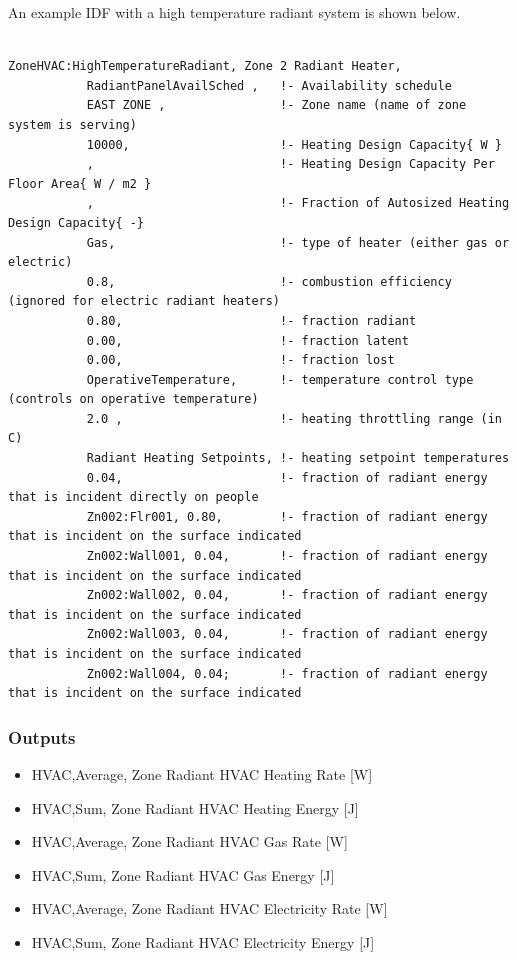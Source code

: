 An example IDF with a high temperature radiant system is shown below.

\begin{lstlisting}

ZoneHVAC:HighTemperatureRadiant, Zone 2 Radiant Heater,
           RadiantPanelAvailSched ,   !- Availability schedule
           EAST ZONE ,                !- Zone name (name of zone system is serving)
           10000,                     !- Heating Design Capacity{ W }
           ,                          !- Heating Design Capacity Per Floor Area{ W / m2 }
           ,                          !- Fraction of Autosized Heating Design Capacity{ -}
           Gas,                       !- type of heater (either gas or electric)
           0.8,                       !- combustion efficiency (ignored for electric radiant heaters)
           0.80,                      !- fraction radiant
           0.00,                      !- fraction latent
           0.00,                      !- fraction lost
           OperativeTemperature,      !- temperature control type (controls on operative temperature)
           2.0 ,                      !- heating throttling range (in C)
           Radiant Heating Setpoints, !- heating setpoint temperatures
           0.04,                      !- fraction of radiant energy that is incident directly on people
           Zn002:Flr001, 0.80,        !- fraction of radiant energy that is incident on the surface indicated
           Zn002:Wall001, 0.04,       !- fraction of radiant energy that is incident on the surface indicated
           Zn002:Wall002, 0.04,       !- fraction of radiant energy that is incident on the surface indicated
           Zn002:Wall003, 0.04,       !- fraction of radiant energy that is incident on the surface indicated
           Zn002:Wall004, 0.04;       !- fraction of radiant energy that is incident on the surface indicated
\end{lstlisting}

\subsubsection{Outputs}\label{outputs-8-006}

\begin{itemize}
\item
  HVAC,Average, Zone Radiant HVAC Heating Rate {[}W{]}
\item
  HVAC,Sum, Zone Radiant HVAC Heating Energy {[}J{]}
\item
  HVAC,Average, Zone Radiant HVAC Gas Rate {[}W{]}
\item
  HVAC,Sum, Zone Radiant HVAC Gas Energy {[}J{]}
\item
  HVAC,Average, Zone Radiant HVAC Electricity Rate {[}W{]}
\item
  HVAC,Sum, Zone Radiant HVAC Electricity Energy {[}J{]}
\end{itemize}

